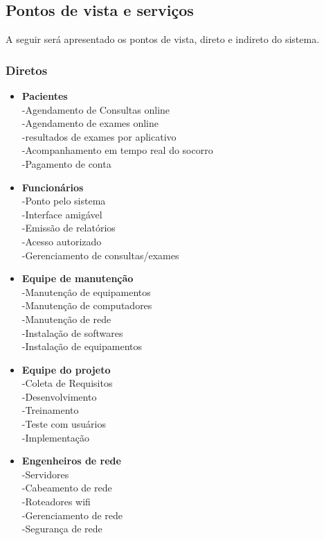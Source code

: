 \subsection{ Pontos de vista e serviços}
A seguir será apresentado os pontos de vista, direto e indireto do sistema.
\subsubsection{ Diretos}
\begin{itemize}
  \item \textbf{Pacientes}\\
  -Agendamento de Consultas online\\
-Agendamento de exames online\\
-resultados de exames por aplicativo\\
-Acompanhamento em tempo real do socorro\\
-Pagamento de conta\\

  \item \textbf{Funcionários}\\
 -Ponto pelo sistema\\
-Interface amigável\\
-Emissão de relatórios\\
-Acesso autorizado\\
-Gerenciamento de consultas/exames\\

  \item \textbf{Equipe de manutenção}\\
 -Manutenção de equipamentos\\
-Manutenção de computadores\\
-Manutenção de rede\\
-Instalação de softwares\\
-Instalação de equipamentos\\

  \item \textbf{Equipe do projeto}\\
 -Coleta de Requisitos\\
-Desenvolvimento\\
-Treinamento\\
-Teste com usuários\\
-Implementação\\


  \item \textbf{Engenheiros de rede}\\
-Servidores\\
-Cabeamento de rede\\
-Roteadores wifi\\
-Gerenciamento de rede\\
-Segurança de rede\\

\end{itemize}
